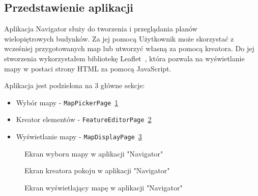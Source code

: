 \subsection{Przedstawienie aplikacji}

Aplikacja Navigator służy do tworzenia i przeglądania planów\\%
wielopiętrowych budynków.
Za jej pomocą Użytkownik może skorzystać z wcześniej przygotowanych map lub utworzyć własną za pomocą kreatora.
Do jej stworzenia wykorzystałem bibliotekę Leaflet~\cite{leafletGithub}, 
która pozwala na wyświetlanie mapy w postaci strony HTML za pomocą JavaScript.

Aplikacja jest podzielona na 3 główne sekcje: 
\begin{itemize}
    \item Wybór mapy - \verb|MapPickerPage|~\ref{img:MapPickerPage}
    \item Kreator elementów - \verb|FeatureEditorPage|~\ref{img:FeatureEditorPage}
    \item Wyświetlanie mapy - \verb|MapDisplayPage|~\ref{img:MapDisplayPage}
\end{itemize}

\begin{figure}[hb]
    \centering
    \caption{Ekran wyboru mapy w aplikacji "Navigator"}
    \label{img:MapPickerPage}
\end{figure}
\clearpage
{}
\begin{figure}[ht]
    \centering
    \caption{Ekran kreatora pokoju w aplikacji "Navigator"}
    \label{img:FeatureEditorPage}
\end{figure}


\begin{figure}[H]
    \centering
    \caption{Ekran wyświetlający mapę w aplikacji "Navigator"}
    \label{img:MapDisplayPage}
\end{figure}
\restoregeometry
